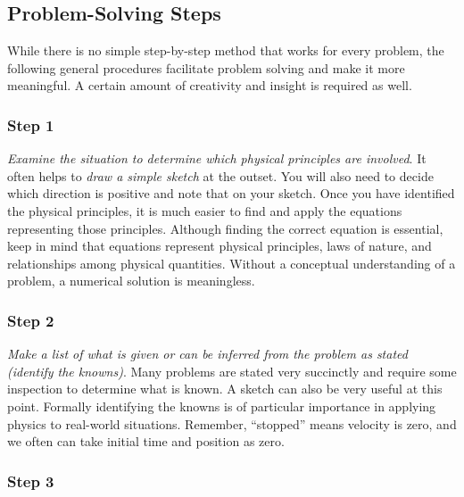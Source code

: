 \documentclass[
]{book}
\begin{document}
\hypertarget{fs-id952201}{}
\hypertarget{problem-solving-steps}{%
\subsection{Problem-Solving Steps}\label{problem-solving-steps}}

While there is no simple step-by-step method that works for every
problem, the following general procedures facilitate problem solving and
make it more meaningful. A certain amount of creativity and insight is
required as well.

\hypertarget{fs-id2092387}{}
\hypertarget{step-1}{%
\subsubsection{Step 1}\label{step-1}}

\emph{Examine the situation to determine which physical principles are
involved}. It often helps to \emph{draw a simple sketch} at the outset. You
will also need to decide which direction is positive and note that on
your sketch. Once you have identified the physical principles, it is
much easier to find and apply the equations representing those
principles. Although finding the correct equation is essential, keep in
mind that equations represent physical principles, laws of nature, and
relationships among physical quantities. Without a conceptual
understanding of a problem, a numerical solution is meaningless.

\hypertarget{fs-id2204794}{}
\hypertarget{step-2}{%
\subsubsection{Step 2}\label{step-2}}

\emph{Make a list of what is given or can be inferred from the problem as
stated (identify the knowns)}. Many problems are stated very succinctly
and require some inspection to determine what is known. A sketch can
also be very useful at this point. Formally identifying the knowns is of
particular importance in applying physics to real-world situations.
Remember, ``stopped'' means velocity is zero, and we often can take
initial time and position as zero.

\hypertarget{fs-id1754393}{}
\hypertarget{step-3}{%
\subsubsection{Step 3}\label{step-3}}
\end{document}
